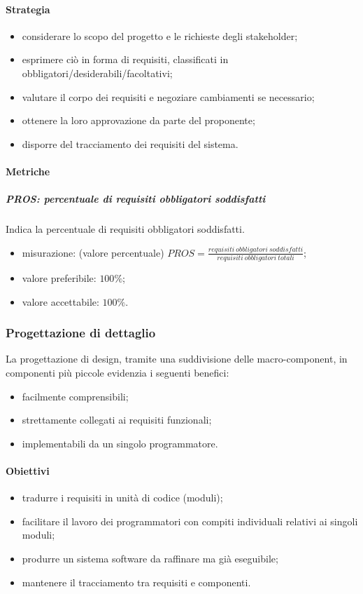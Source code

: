 		\paragraph{Strategia}
		\begin{itemize}
			\item considerare lo scopo del progetto e le richieste degli stakeholder\glo;
			\item esprimere ciò in forma di requisiti, classificati in obbligatori/desiderabili/facoltativi;
			\item valutare il corpo dei requisiti e negoziare cambiamenti se necessario;
			\item ottenere la loro approvazione da parte del proponente;
			\item disporre del tracciamento dei requisiti del sistema.
		\end{itemize}
		
		\paragraph{Metriche}
			\subparagraph{PROS: percentuale di requisiti obbligatori soddisfatti} Indica la percentuale di requisiti obbligatori soddisfatti.
			\begin{itemize}
				\item misurazione: (valore percentuale) $ PROS = \frac{requisiti\ obbligatori\ soddisfatti}{requisiti\ obbligatori\ totali}$;
				\item valore preferibile: $100\%$;
				\item valore accettabile: $100\%$.
			\end{itemize}
	
			
	\subsubsection{Progettazione di dettaglio}
	La progettazione di design, tramite una suddivisione delle macro-component, in componenti più piccole evidenzia i seguenti benefici:
	\begin{itemize}
		\item facilmente comprensibili;
		\item strettamente collegati ai requisiti funzionali;
		\item implementabili da un singolo programmatore.
	\end{itemize}
		\paragraph{Obiettivi}
		\begin{itemize}
			\item tradurre i requisiti in unità di codice (moduli);
			\item facilitare il lavoro dei programmatori con compiti individuali relativi ai singoli moduli;
			\item produrre un sistema software da raffinare ma già eseguibile;
			\item mantenere il tracciamento tra requisiti e componenti.
		\end{itemize}
